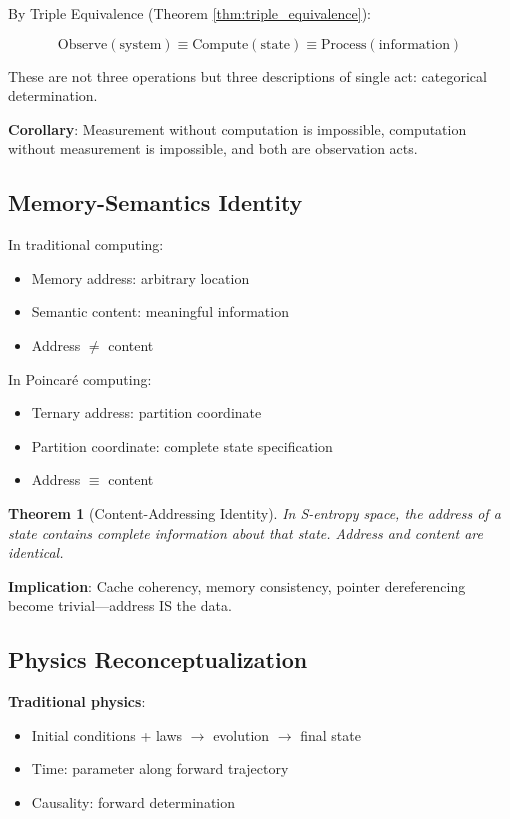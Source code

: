 \documentclass[twocolumn,10pt]{article}
\newtheorem{theorem}{Theorem}
\begin{document}
By Triple Equivalence (Theorem \ref{thm:triple_equivalence}):

\begin{equation}
\text{Observe}(\text{system}) \equiv \text{Compute}(\text{state}) \equiv \text{Process}(\text{information})
\end{equation}

These are not three operations but three descriptions of single act: categorical determination.

\textbf{Corollary}: Measurement without computation is impossible, computation without measurement is impossible, and both are observation acts.

\subsection{Memory-Semantics Identity}

In traditional computing:
\begin{itemize}
\item Memory address: arbitrary location
\item Semantic content: meaningful information
\item Address $\neq$ content
\end{itemize}

In Poincaré computing:
\begin{itemize}
\item Ternary address: partition coordinate
\item Partition coordinate: complete state specification
\item Address $\equiv$ content
\end{itemize}

\begin{theorem}[Content-Addressing Identity]
In S-entropy space, the address of a state contains complete information about that state. Address and content are identical.
\end{theorem}

\textbf{Implication}: Cache coherency, memory consistency, pointer dereferencing become trivial—address IS the data.

\subsection{Physics Reconceptualization}

\textbf{Traditional physics}:
\begin{itemize}
\item Initial conditions + laws $\to$ evolution $\to$ final state
\item Time: parameter along forward trajectory
\item Causality: forward determination
\end{itemize}
\end{document}
